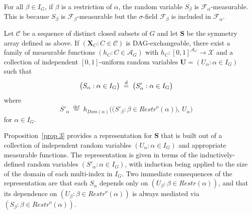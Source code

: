 \documentclass[AHL,Unicode,longabstracts,published]{cedram}
\newcommand{\alf}{\alpha}%
\newcommand*\bb{\beta}
\newcommand*{\defeq}{\stackrel{\mathrm{def}}{=}}
\renewcommand{\d}{\buildrel{d}\over{=}}
\newcommand*\rstr{\mathit{Restr}}
\newcommand*\srstr{\mathit{Restr}^o}
\newcommand*\dom{\mathit{Dom}}
\renewcommand{\AA}{\mathcal{A}}
\newcommand*\CC{{\mathcal{C}}}
\newcommand*\XX{{\mathcal{X}}}
\newcommand*\bS{\mathbf{S}}
\newcommand*\bU{\mathbf{U}}
\newcommand*\bX{\mathbf{X}}
\begin{document}
For all $\bb \in I_G$, if $\bb$ is a restriction of $\alf$, the random variable $S_{\bb}$ is $\mathcal{F}_\alf$-measurable. This is because $S_{\bb}$ is $\mathcal{F}_\bb$-measurable but the $\sigma$-field $\mathcal{F}_\bb$ is included in $\mathcal{F}_\alf$.

\begin{prop}\label{prop 3}
Let $\CC$ be a sequence of distinct closed subsets of $G$ and let $\bS$ be the {symmetry} array defined as above. If $(\bX_C : C \in \CC)$ is DAG-exchangeable, there exist a family of measurable functions $(h_C : C \in \AA_G)$ with $h_C : [0,1]^{\AA_C} \to \XX$ and a collection of independent $[0,1]$-uniform random variables $\bU = (U_\alf : \alf \in I_G)$ such that
\begin{equation}\label{equation: S and S'}
\big(S_\alf : \alf \in I_G\big) \;\d\; \big(S'_\alf : \alf \in I_G\big)
\end{equation}
where
\begin{equation}\label{equation: generalized representation of DAG}
S'_\alf \;
\defeq\; h_{\dom(\alf)}\Big(\big(S'_{\bb} : \bb \in \srstr(\alf)\big),\, U_\alf \Big)
\end{equation}
for $\alf \in I_G$.
\end{prop}

Proposition~\ref{prop 3} provides a representation for $\bS$ that is built out of a collection of independent random variables $(U_\alf : \alf \in I_G)$ and appropriate measurable functions. The representation is given in terms of the inductively-defined random variables $(S'_\alf: \alf\in I_G)$, with induction being applied to the size of the domain of each multi-index in $I_G$. Two immediate consequences of the representation are that each $S_\alf$ depends only on $(U_\bb : \bb \in \rstr(\alf))$, and that its dependence on $(U_\bb : \bb \in \srstr(\alf))$ is always mediated via $(S_\beta : \beta \in \srstr(\alf))$.
\end{document}

